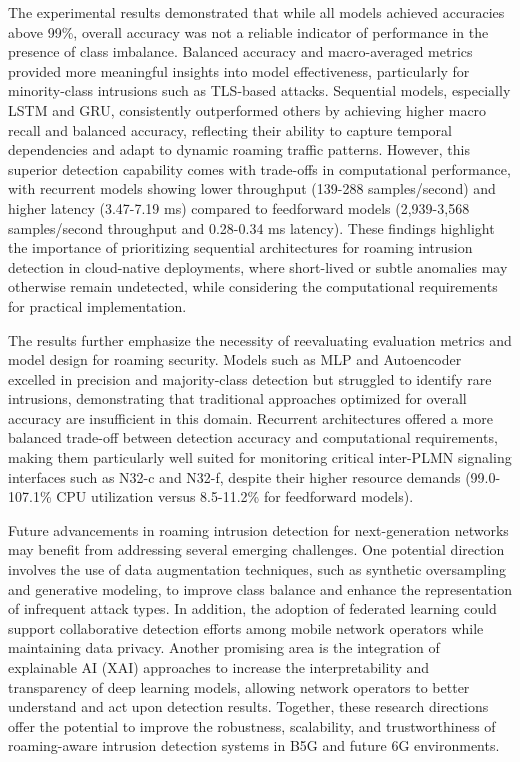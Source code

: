 \documentclass[journal,article,submit,moreauthors,pdftex]{Definitions/tsp}
\begin{document}
The experimental results demonstrated that while all models achieved accuracies above 99\%, overall accuracy was not a reliable indicator of performance in the presence of class imbalance. Balanced accuracy and macro-averaged metrics provided more meaningful insights into model effectiveness, particularly for minority-class intrusions such as TLS-based attacks. Sequential models, especially LSTM and GRU, consistently outperformed others by achieving higher macro recall and balanced accuracy, reflecting their ability to capture temporal dependencies and adapt to dynamic roaming traffic patterns. However, this superior detection capability comes with trade-offs in computational performance, with recurrent models showing lower throughput (139-288 samples/second) and higher latency (3.47-7.19 ms) compared to feedforward models (2,939-3,568 samples/second throughput and 0.28-0.34 ms latency). These findings highlight the importance of prioritizing sequential architectures for roaming intrusion detection in cloud-native deployments, where short-lived or subtle anomalies may otherwise remain undetected, while considering the computational requirements for practical implementation.

The results further emphasize the necessity of reevaluating evaluation metrics and model design for roaming security. Models such as MLP and Autoencoder excelled in precision and majority-class detection but struggled to identify rare intrusions, demonstrating that traditional approaches optimized for overall accuracy are insufficient in this domain. Recurrent architectures offered a more balanced trade-off between detection accuracy and computational requirements, making them particularly well suited for monitoring critical inter-PLMN signaling interfaces such as N32-c and N32-f, despite their higher resource demands (99.0-107.1\% CPU utilization versus 8.5-11.2\% for feedforward models).

Future advancements in roaming intrusion detection for next-generation networks may benefit from addressing several emerging challenges. One potential direction involves the use of data augmentation techniques, such as synthetic oversampling and generative modeling, to improve class balance and enhance the representation of infrequent attack types. In addition, the adoption of federated learning could support collaborative detection efforts among mobile network operators while maintaining data privacy. Another promising area is the integration of explainable AI (XAI) approaches to increase the interpretability and transparency of deep learning models, allowing network operators to better understand and act upon detection results. Together, these research directions offer the potential to improve the robustness, scalability, and trustworthiness of roaming-aware intrusion detection systems in B5G and future 6G environments.
\end{document}
